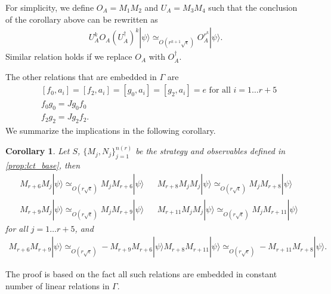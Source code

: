 \documentclass[11pt,letterpaper]{article}
\newcommand{\ket}[1]{|#1\rangle}
\newcommand{\ct}{^{\dagger}}
\newcommand{\1}{\mathbb{1}}
\newcommand{\nr}{n(r)}
\newcommand{\se}{\sqrt{\epsilon}}
\newcommand{\appd}[1]{\simeq_{#1}}
\newtheorem{corollary}[theorem]{Corollary}
\theoremstyle{definition}
\begin{document}
For simplicity, we define $O_A = M_1M_2$ and $U_A=M_3M_4$ such that
the conclusion of the corollary above can be rewritten as 
\begin{align}
	U_A^k O_A (U_A\ct)^k \ket{\psi} \appd{O(r^{k+1} \se)} O_A^{r^k} \ket{\psi}.
\end{align}
Similar relation holds if we replace $O_A$ with $O_A\ct$.

The other relations that are embedded in $\Gamma$ are 
\begin{align}
	&[f_0, a_i] = [f_2, a_i] = [g_0, a_i] = [g_2, a_i] = e \text{ for all } i = 1 \dots r+5 \\
	&f_0g_0 = Jg_0f_0 \\
	&f_2g_2 = J g_2 f_2.
\end{align}
We summarize the implications in the following corollary.
\begin{corollary}
	Let $S$, $\{M_j, N_j\}_{j=1}^{\nr}$ be the strategy and observables defined in \cref{prop:lct_base},
	then
	\begin{align}
		&M_{r+6} M_j \ket{\psi} \appd{O(r\se)} M_j M_{r+6} \ket{\psi} && 
		M_{r+8}M_jM_j \ket{\psi} \appd{O(r\se)} M_j M_{r+8} \ket{\psi} \\
		&M_{r+9} M_j \ket{\psi} \appd{O(r\se)} M_j M_{r+9} \ket{\psi} && 
		M_{r+11}M_jM_j \ket{\psi} \appd{O(r\se)} M_j M_{r+11} \ket{\psi} 
	\end{align}
	for all $j = 1 \dots r+5$, and
	\begin{align}
		M_{r+6}M_{r+9} \ket{\psi} \appd{O(r\se)} - M_{r+9}M_{r+6} \ket{\psi} 
		M_{r+8}M_{r+11} \ket{\psi} \appd{O(r\se)} -M_{r+11}M_{r+8} \ket{\psi}.
	\end{align}
\end{corollary}
The proof is based on the fact all such relations are embedded in constant number of linear relations in $\Gamma$.
\end{document}
